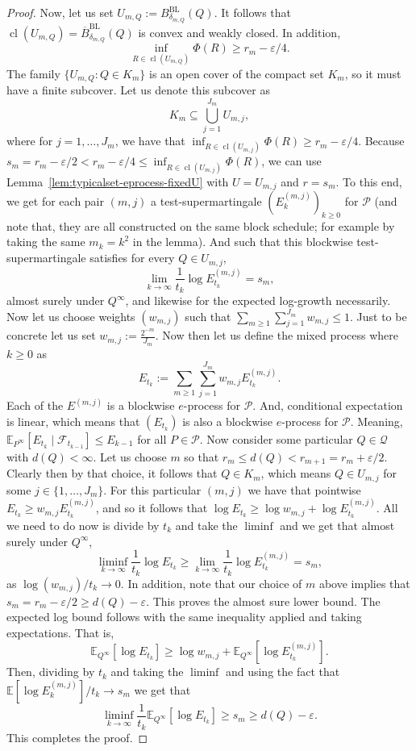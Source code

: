 \documentclass[11pt]{article}
\newcommand{\E}{\mathbb{E}}
\newcommand{\Pcal}{\mathcal{P}}
\newcommand{\Qcal}{\mathcal{Q}}
\DeclareMathOperator{\cl}{cl}
\theoremstyle{definition}
\theoremstyle{definition}
\begin{document}
\begin{proof}
Now, let us set $U_{m,Q}:=B^{\mathrm{BL}}_{\delta_{m,Q}}(Q)$. It follows that $\cl(U_{m,Q})=\overline B^{\mathrm{BL}}_{\delta_{m,Q}}(Q)$ is convex and weakly closed. In addition,
\[
\inf_{R\in\cl(U_{m,Q})}\Phi(R)\ge r_m-\varepsilon/4.
\]
The family $\{U_{m, Q}:Q\in K_m\}$ is an open cover of the compact set $K_m$, so it must have a finite subcover. Let us denote this subcover as
\[
K_m\subseteq \bigcup_{j=1}^{J_m}U_{m,j},
\]
where for $j=1,\dots,J_m$, we have that $\inf_{R\in\cl(U_{m,j})}\Phi(R)\ge r_m-\varepsilon/4$. Because $s_m=r_m-\varepsilon/2<r_m-\varepsilon/4\le \inf_{R\in\cl(U_{m,j})}\Phi(R)$, we can use Lemma~\ref{lem:typicalset-eprocess-fixedU} with $U=U_{m,j}$ and $r=s_m$. To this end, we get for each pair $(m, j)$ a test-supermartingale $(E^{(m,j)}_k)_{k\ge 0}$ for $\Pcal$ (and note that, they are all constructed on the same block schedule; for example by taking the same $m_k=k^2$ in the lemma). And such that this blockwise test-supermartingale satisfies for every $Q\in U_{m,j}$,
\[
\lim_{k\to\infty}\frac{1}{t_k}\log E^{(m,j)}_{t_k} = s_m,
\]
almost surely under $Q^\infty$, and likewise for the expected log-growth necessarily. Now let us choose weights $(w_{m, j})$ such that $\sum_{m\ge 1}\sum_{j=1}^{J_m}w_{m,j}\le 1$. Just to be concrete let us set $w_{m,j}:=\frac{2^{-m}}{J_m}$. Now then let us define the mixed process where $k\ge 0$ as
\[
E_{t_k}:=\sum_{m\ge 1}\sum_{j=1}^{J_m} w_{m,j}E^{(m,j)}_{t_k}.
\]
Each of the $E^{(m,j)}$ is a blockwise $e$-process for $\Pcal$. And, conditional expectation is linear, which means that $(E_{t_k})$ is also a blockwise $e$-process for $\Pcal$. Meaning, $\E_{P^\infty}[E_{t_k}\mid\mathcal F_{t_{k-1}}]\le E_{k-1}$ for all $P\in\Pcal$. Now consider some particular $Q\in\Qcal$ with $d(Q)<\infty$. Let us choose $m$ so that $r_m\le d(Q)<r_{m+1}=r_m+\varepsilon/2$. Clearly then by that choice, it follows that $Q\in K_m$, which means $Q\in U_{m,j}$ for some $j\in\{1,\dots,J_m\}$. For this particular $(m,j)$ we have that pointwise $E_{t_k}\ge w_{m,j}E^{(m,j)}_{t_k}$, and so it follows that $\log E_{t_k}\ge \log w_{m,j}+\log E^{(m,j)}_{t_k}$. All we need to do now is divide by $t_k$ and take the $\liminf$ and we get that almost surely under $Q^\infty$,
\[
\liminf_{k\to\infty}\frac{1}{t_k}\log E_{t_k} \ge \lim_{k\to\infty}\frac{1}{t_k}\log E^{(m,j)}_{t_k} = s_m,
\]
as $\log(w_{m,j})/t_k\to0$. In addition, note that our choice of $m$ above implies that $s_m=r_m-\varepsilon/2 \ge d(Q)-\varepsilon$. This proves the almost sure lower bound. The expected log bound follows with the same inequality applied and taking expectations. That is,
\[
\E_{Q^\infty}[\log E_{t_k}] \ge \log w_{m,j}+\E_{Q^\infty}[\log E^{(m,j)}_{t_k}].
\]
Then, dividing by $t_k$ and taking the $\liminf$ and using the fact that $\E[\log E^{(m,j)}_k]/t_k\to s_m$ we get that
\[
\liminf_{k\to\infty}\frac{1}{t_k}\E_{Q^\infty}[\log E_{t_k}]\ge s_m\ge d(Q)-\varepsilon.
\]
This completes the proof.
\end{proof}
\end{document}

